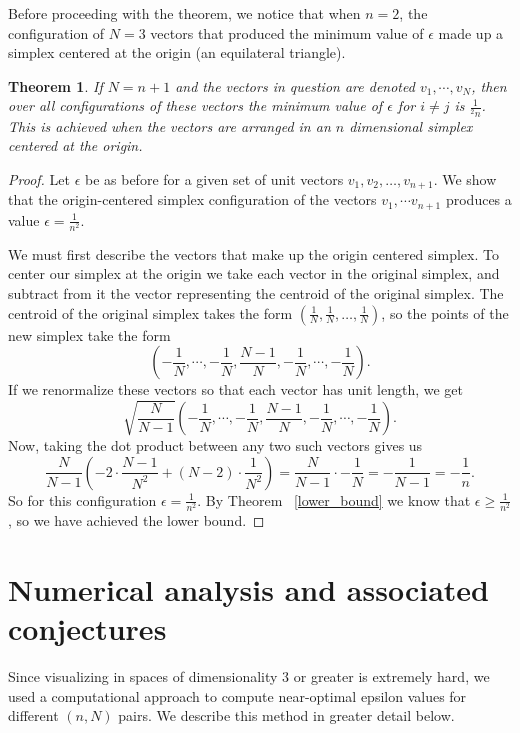 \documentclass[11pt,letterpaper,twoside,english]{article}
\theoremstyle{theorem}
\newtheorem{theorem}{Theorem}[section]
\theoremstyle{remark}
\begin{document}
Before proceeding with the theorem, we notice that when $n=2$, the configuration of $N=3$ vectors that produced the minimum value of $\epsilon$ made up a simplex centered at the origin (an equilateral triangle). 


\begin{theorem}
If $N=n+1$ and the vectors in question are denoted $v_1,\cdots, v_N$, then over all configurations of these vectors the minimum value of $\epsilon$ for $i\neq j$ is $\frac{1}{^2n}$. This is achieved when the vectors are arranged in an $n$ dimensional simplex centered at the origin.
\label{simplex}
\end{theorem}

\begin{proof}
Let $\epsilon$ be as before for a given set of unit vectors $v_1, v_2, \ldots, v_{n+1}$. We show that the origin-centered simplex configuration of the vectors $v_1,\cdots v_{n+1}$ produces a value $\epsilon=\frac{1}{n^2}$. 

We must first describe the vectors that make up the origin centered simplex. To center our simplex at the origin we take each vector in the original simplex, and subtract from it the vector representing the centroid of the original simplex. The centroid of the original simplex takes the form $(\frac{1}{N},\frac{1}{N},\ldots,\frac{1}{N})$, so the points of the new simplex take the form
$$
\left(-\frac{1}{N},\cdots,-\frac{1}{N},\frac{N-1}{N},-\frac{1}{N},\cdots,-\frac{1}{N}\right).
$$
If we renormalize these vectors so that each vector has unit length, we get 
$$
\sqrt{\frac{N}{N-1}}\left(-\frac{1}{N},\cdots,-\frac{1}{N},\frac{N-1}{N},-\frac{1}{N},\cdots,-\frac{1}{N}\right).
$$
Now, taking the dot product between any two such vectors gives us
$$
\frac{N}{N-1}\left(-2\cdot\frac{N-1}{N^2}+(N-2)\cdot\frac{1}{N^2}\right)=\frac{N}{N-1}\cdot-\frac{1}{N}=-\frac{1}{N-1}=-\frac{1}{n}.
$$
So for this configuration $\epsilon=\frac{1}{n^2}$. By Theorem ~\ref{lower_bound} we know that $\epsilon\ge \frac{1}{n^2}$, so we have achieved the lower bound. 
\end{proof}
\section{Numerical analysis and associated conjectures}

Since visualizing in spaces of dimensionality $3$ or greater is extremely hard, we used a computational approach to compute near-optimal epsilon values for different $(n, N)$ pairs. We describe this method in greater detail below.
\end{document}

